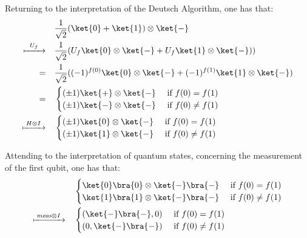 Returning to the interpretation of the Deutsch Algorithm, one has that:
\begin{equation}
\begin{split}
  \quad & \frac{1}{\sqrt{2}}(\ket{0} + \ket{1}) \otimes \ket{-}\\
  \xmapsto{ \hspace{5 pt} U_{f} \hspace{5pt}} \quad & \frac{1}{\sqrt{2}}( U_{f} \ket{0} \otimes \ket{-} + U_{f} \ket{1} \otimes \ket{-})) \\
  = \quad & \frac{1}{\sqrt{2}}( (-1)^{f(0)} \ket{0} \otimes \ket{-} + (-1)^{f(1)} \ket{1} \otimes \ket{-}) \\
  = \quad &
  \begin{cases}
    (\pm 1) \ket{+} \otimes \ket{-} &\text{ if }   f(0)= f(1) \\
    (\pm 1) \ket{-} \otimes \ket{-} &\text{ if }   f(0) \neq f(1)
  \end{cases} \\
  \xmapsto{ \hspace{2pt} H \otimes I \hspace{2pt}} \quad & 
  \begin{cases}
    (\pm 1) \ket{0} \otimes \ket{-} &\text{ if }   f(0)= f(1) \\
    (\pm 1) \ket{1} \otimes \ket{-} &\text{ if }   f(0) \neq f(1)\\
  \end{cases} 
\end{split}
\end{equation}

Attending to the interpretation of quantum states, concerning the measurement of the first qubit, one has that:
\begin{equation}
\begin{split}
  \quad &
  \begin{cases}
    \ket{0} \bra{0} \otimes \ket{-} \bra{-}  &\text{ if }   f(0)= f(1) \\
    \ket{1} \bra{1} \otimes \ket{-} \bra{-} &\text{ if }   f(0) \neq f(1)
  \end{cases} \\
  \xmapsto{ \hspace{2pt} \textit{meas} \otimes I \hspace{2pt}} \quad &
  \begin{cases}
   (\ket{-} \bra{-},0)  &\text{ if }   f(0)= f(1) \\
   (0,\ket{-} \bra{-}) &\text{ if }   f(0) \neq f(1) 
  \end{cases} \\
\end {split}
\end{equation} 


